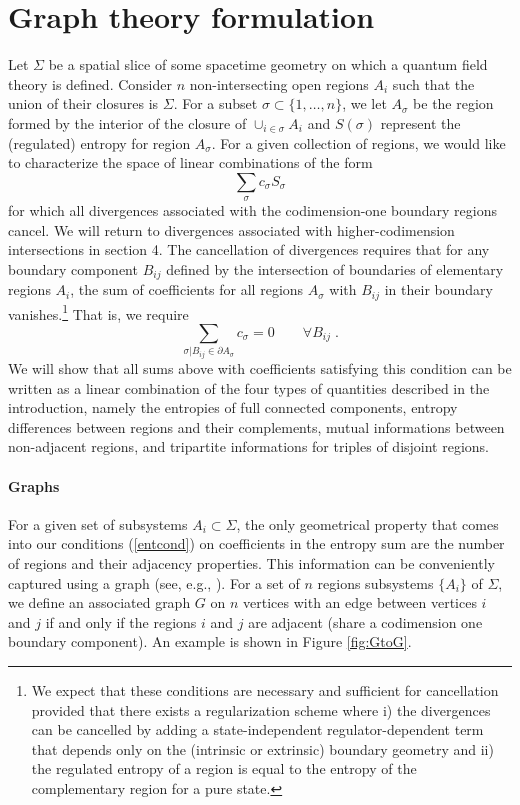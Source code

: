 \documentclass[12pt]{article}
\theoremstyle{definition}
\begin{document}
\section{Graph theory formulation}

Let $\Sigma$ be a spatial slice of some spacetime geometry on which a quantum field theory is defined. Consider $n$ non-intersecting open regions $A_i$ such that the union of their closures is $\Sigma$. For a subset $\sigma \subset \{1,\dots, n\}$, we let $A_\sigma$ be the region formed by the interior of the closure of $\cup_{i \in \sigma} A_i$ and $S(\sigma)$ represent the (regulated) entropy for region $A_\sigma$. For a given collection of regions, we would like to characterize the space of linear combinations of the form 
\[
\sum_{\sigma} c_\sigma S_\sigma
\]
for which all divergences associated with the codimension-one boundary regions cancel. We will return to divergences associated with higher-codimension intersections in section 4. The cancellation of divergences requires that for any boundary component $B_{ij}$ defined by the intersection of boundaries of elementary regions $A_i$, the sum of coefficients for all regions $A_\sigma$ with $B_{ij}$ in their boundary vanishes.\footnote{We expect that these conditions are necessary and sufficient for cancellation provided that there exists a regularization scheme where i) the divergences can be cancelled by adding a state-independent regulator-dependent term that depends only on the (intrinsic or extrinsic) boundary geometry and ii) the regulated entropy of a region is equal to the entropy of the complementary region for a pure state.} That is, we require
\begin{equation}
\label{entcond}
\sum_{\sigma | B_{ij} \in \partial A_{\sigma}} c_\sigma = 0 \qquad \forall B_{ij} \; .
\end{equation}
We will show that all sums above with coefficients satisfying this condition can be written as a linear combination of the four types of quantities described in the introduction, namely the entropies of full connected components, entropy differences between regions and their complements, mutual informations between non-adjacent regions, and tripartite informations for triples of disjoint regions.  

\paragraph{Graphs} For a given set of subsystems $A_i \subset \Sigma$, the only geometrical property that comes into our conditions (\ref{entcond}) on coefficients in the entropy sum are the number of regions and their adjacency properties. This information can be conveniently captured using a graph  (see, e.g., \cite{Diestel2017}). For a set of $n$ regions subsystems $\{A_i\}$ of $\Sigma$, we define an associated graph $G$ on $n$ vertices with an edge between vertices $i$ and $j$ if and only if the regions $i$ and $j$ are adjacent (share a codimension one boundary component). An example is shown in Figure \ref{fig:GtoG}.
\end{document}

